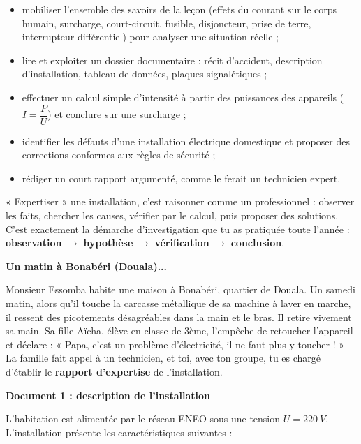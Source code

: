 \documentclass[11pt]{article}
\newcommand{\cle}[1]{{\popxbold\color{popdark}#1}}
\newcounter{popsec}
\newcounter{popsub}
\newcommand{\courssub}[1]{%
  \stepcounter{popsub}%
  \par\vspace{9pt}\noindent{\popxbold\fontsize{11.5}{13}\selectfont\color{popink}{\color{poporange}\thepopsec.\thepopsub}\hspace{6pt}#1}\par\nopagebreak\vspace{4pt}
}
\begin{document}
\begin{itemize}
\item mobiliser l'ensemble des savoirs de la leçon (effets du courant sur le corps humain, surcharge, court-circuit, fusible, disjoncteur, prise de terre, interrupteur différentiel) pour analyser une situation réelle ;
\item lire et exploiter un dossier documentaire : récit d'accident, description d'installation, tableau de données, plaques signalétiques ;
\item effectuer un calcul simple d'intensité à partir des puissances des appareils ($I = \dfrac{P}{U}$) et conclure sur une surcharge ;
\item identifier les défauts d'une installation électrique domestique et proposer des corrections conformes aux règles de sécurité ;
\item rédiger un court rapport argumenté, comme le ferait un technicien expert.
\end{itemize}

\begin{aretenir}
« Expertiser » une installation, c'est raisonner comme un professionnel : observer les faits, chercher les causes, vérifier par le calcul, puis proposer des solutions. C'est exactement la démarche d'investigation que tu as pratiquée toute l'année : \textbf{observation} $\rightarrow$ \textbf{hypothèse} $\rightarrow$ \textbf{vérification} $\rightarrow$ \textbf{conclusion}.
\end{aretenir}

\courssub{Situation}

\textbf{Un matin à Bonabéri (Douala)...}

Monsieur Essomba habite une maison à Bonabéri, quartier de Douala. Un samedi matin, alors qu'il touche la carcasse métallique de sa machine à laver en marche, il ressent des \cle{picotements} désagréables dans la main et le bras. Il retire vivement sa main. Sa fille Aïcha, élève en classe de 3ème, l'empêche de retoucher l'appareil et déclare : « Papa, c'est un problème d'électricité, il ne faut plus y toucher ! » La famille fait appel à un technicien, et toi, avec ton groupe, tu es chargé d'établir le \textbf{rapport d'expertise} de l'installation.

\textbf{Document 1 : description de l'installation}

L'habitation est alimentée par le réseau ENEO sous une tension $U = \SI{220}{V}$. L'installation présente les caractéristiques suivantes :
\end{document}
